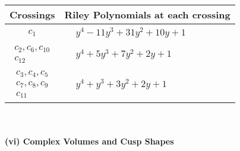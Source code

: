 \documentclass[1p]{elsarticle_modified}
\theoremstyle{definition}
\begin{document}
\begin{tabular}{m{50pt}|m{274pt}}
Crossings & \hspace{64pt}Riley Polynomials at each crossing \\
\hline $$\begin{aligned}c_{1}\end{aligned}$$&$\begin{aligned}
&y^4-11 y^3+31 y^2+10 y+1
\end{aligned}$\\
\hline $$\begin{aligned}c_{2},c_{6},c_{10}\\c_{12}\end{aligned}$$&$\begin{aligned}
&y^4+5 y^3+7 y^2+2 y+1
\end{aligned}$\\
\hline $$\begin{aligned}c_{3},c_{4},c_{5}\\c_{7},c_{8},c_{9}\\c_{11}\end{aligned}$$&$\begin{aligned}
&y^4+y^3+3 y^2+2 y+1
\end{aligned}$\\
\hline
\end{tabular}\\~\\
\newpage\flushleft \textbf{(vi) Complex Volumes and Cusp Shapes}
\end{document}
